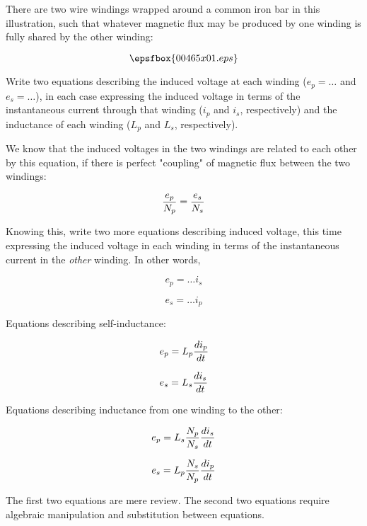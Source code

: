 

There are two wire windings wrapped around a common iron bar in this illustration, such that whatever magnetic flux may be produced by one winding is fully shared by the other winding:

$$\epsfbox{00465x01.eps}$$

Write two equations describing the induced voltage at each winding ($e_p = \dots$ and $e_s = \dots$), in each case expressing the induced voltage in terms of the instantaneous current through that winding ($i_p$ and $i_s$, respectively) and the inductance of each winding ($L_p$ and $L_s$, respectively).

We know that the induced voltages in the two windings are related to each other by this equation, if there is perfect "coupling" of magnetic flux between the two windings:

$${e_p \over N_p} = {e_s \over N_s}$$

Knowing this, write two more equations describing induced voltage, this time expressing the induced voltage in each winding in terms of the instantaneous current in the {\it other} winding.  In other words,

$$e_p = \dots i_s$$

$$e_s = \dots i_p$$







Equations describing self-inductance:

$$e_p = L_p{di_p \over dt}$$

$$e_s = L_s{di_s \over dt}$$

\vskip 15pt

Equations describing inductance from one winding to the other:

$$e_p = L_s {N_p \over N_s} {di_s \over dt}$$

$$e_s = L_p {N_s \over N_p} {di_p \over dt}$$







The first two equations are mere review.  The second two equations require algebraic manipulation and substitution between equations.




